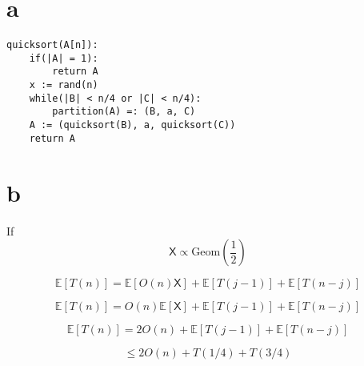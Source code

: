 \documentclass{article}
\newcommand{\rX}{\mathsf{X}}
\newcommand{\E}{\mathbb{E}}
\begin{document}
\section{a}

\begin{verbatim}
quicksort(A[n]):
    if(|A| = 1):
        return A
    x := rand(n)
    while(|B| < n/4 or |C| < n/4):
        partition(A) =: (B, a, C)
    A := (quicksort(B), a, quicksort(C))
    return A

\end{verbatim}

\section{b}

If
$$\rX \propto \text{Geom}(\frac{1}{2})$$

$$\E[T(n)] = \E[O(n)\rX]+\E[T(j-1)]+\E[T(n-j)]$$

$$\E[T(n)] = O(n)\E[\rX]+\E[T(j-1)]+\E[T(n-j)]$$

$$\E[T(n)] = 2O(n)+\E[T(j-1)]+\E[T(n-j)]$$

$$\leq 2O(n)+T(1/4)+T(3/4)$$
\end{document}
